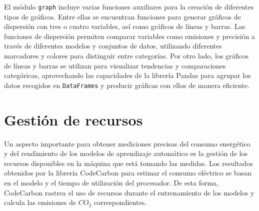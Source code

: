 El módulo \texttt{graph} incluye varias funciones auxiliares para la creación de diferentes tipos de gráficos. Entre ellas se encuentran funciones para generar gráficos de dispersión con tres o cuatro variables, así como gráficos de líneas y barras. Las funciones de dispersión permiten comparar variables como emisiones y precisión a través de diferentes modelos y conjuntos de datos, utilizando diferentes marcadores y colores para distinguir entre categorías. Por otro lado, los gráficos de líneas y barras se utilizan para visualizar tendencias y comparaciones categóricas, aprovechando las capacidades de la librería Pandas para agrupar los datos recogidos en \texttt{DataFrames} y producir gráficas con ellos de manera eficiente.

\section{Gestión de recursos}

Un aspecto importante para obtener mediciones precisas del consumo energético y del rendimiento de los modelos de aprendizaje automático es la gestión de los recursos disponibles en la máquina que está tomando las medidas. Los resultados obtenidos por la librería CodeCarbon para estimar el consumo eléctrico se basan en el modelo y el tiempo de utilización del procesador. De esta forma, CodeCarbon rastrea el uso de recursos durante el entrenamiento de los modelos y calcula las emisiones de $CO_2$ correspondientes.

